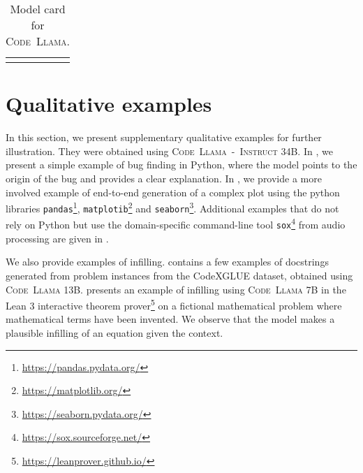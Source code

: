\documentclass[10pt]{article}
\newcommand{\model}{\textsc{Code~Llama}\xspace}
\newcommand{\instmodel}{\textsc{Code~Llama~-~Instruct}\xspace}
\begin{document}
\begin{table}[h!]
{\begin{tabular}{p{}|l}
        \\
        \thickhline
    \end{tabular}
    \caption{Model card for \model.}
    \label{tab:modelcard}
}
\end{table}

 \section{Qualitative examples}
\label{sec:quali_examples}
In this section, we present supplementary qualitative examples for further illustration. They were obtained using \instmodel 34B. In , we present a simple example of bug finding in Python, where the model points to the origin of the bug and provides a clear explanation. In , we provide a more involved example of end-to-end generation of a complex plot using the python libraries \texttt{pandas}\footnote{\url{https://pandas.pydata.org/}}, \texttt{matplotib}\footnote{\url{https://matplotlib.org/}} and \texttt{seaborn}\footnote{\url{https://seaborn.pydata.org/}}. Additional examples that do not rely on Python but use the domain-specific command-line tool \texttt{sox}\footnote{\url{https://sox.sourceforge.net/}} from  audio processing are given in . 

We also provide examples of infilling.  contains a few examples of docstrings generated from problem instances from the CodeXGLUE dataset, obtained using \model 13B.  presents an example of infilling using \model 7B in the Lean 3 interactive theorem prover\footnote{\url{https://leanprover.github.io/}} on a fictional mathematical problem where mathematical terms have been invented. We observe that the model makes a plausible infilling of an equation given the context.
\end{document}

